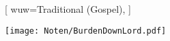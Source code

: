 [
    wuw={Traditional (Gospel)},
]

\beginverse
\endverse
\texttt{[image: Noten/BurdenDownLord.pdf]}



\endsong
